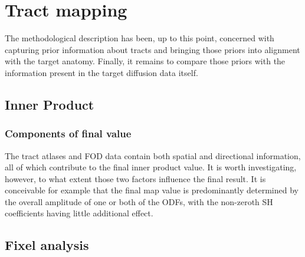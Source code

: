 \section{Tract mapping}
\label{chapterlabel4}


The methodological description has been, up to this point, concerned with capturing
prior information about tracts and bringing those priors into alignment with the target anatomy.
Finally, it remains to compare those priors with the information present in the target diffusion data itself.

\subsection{Inner Product}


\subsubsection{Components of final value}

The tract atlases and FOD data contain both spatial and directional information, all of which contribute to the final inner product value.
It is worth investigating, however, to what extent those two factors influence the final result.
It is conceivable for example that the final map value is predominantly determined by the overall amplitude of one or both of the ODFs, with the non-zeroth SH coefficients having little additional effect.


\subsection{Fixel analysis}
